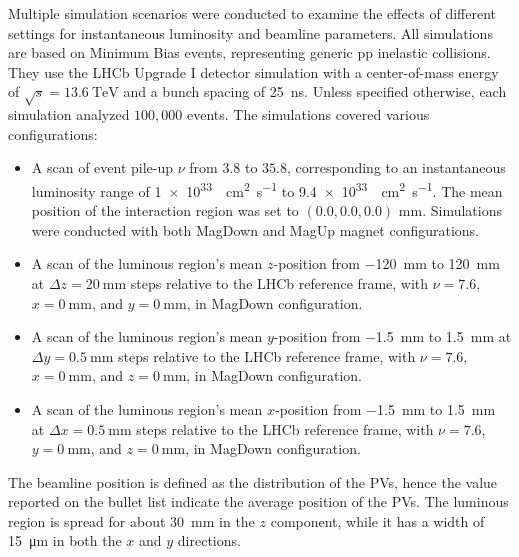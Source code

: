 Multiple simulation scenarios were conducted to examine the effects of different settings for instantaneous luminosity and beamline parameters. All simulations are based on Minimum Bias events, representing generic pp inelastic collisions. They use the LHCb Upgrade I detector simulation with a center-of-mass energy of $\sqrt{s} = \SI{13.6}{\tera\eV}$ and a bunch spacing of \SI{25}{\nano\second}. Unless specified otherwise, each simulation analyzed $100,000$ events. The simulations covered various configurations:

\begin{itemize}
    \item A scan of event pile-up \(\nu\) from $3.8$ to $35.8$, corresponding to an instantaneous luminosity range of \SI{1e33}{\per\centi\meter\squared\per\second} to \SI{9.4e33}{\per\centi\meter\squared\per\second}. The mean position of the interaction region was set to $(0.0, 0.0, 0.0)$ mm. Simulations were conducted with both MagDown and MagUp magnet configurations.

    \item A scan of the luminous region's mean $z$-position from \SI{-120}{\milli\meter} to \SI{120}{\milli\meter} at $\Delta z=\SI{20}{\milli\meter}$ steps relative to the LHCb reference frame, with $\nu = 7.6$, $x = \SI{0}{\milli\meter}$, and $y = \SI{0}{\milli\meter}$, in MagDown configuration. 

    \item A scan of the luminous region's mean $y$-position from \SI{-1.5}{\milli\meter} to \SI{1.5}{\milli\meter} at $\Delta y =\SI{0.5}{\milli\meter}$ steps relative to the LHCb reference frame, with $\nu = 7.6$, $x = \SI{0}{\milli\meter}$, and $z = \SI{0}{\milli\meter}$, in MagDown configuration.

     \item A scan of the luminous region's mean $x$-position from \SI{-1.5}{\milli\meter} to \SI{1.5}{\milli\meter} at $\Delta x =\SI{0.5}{\milli\meter}$ steps relative to the LHCb reference frame, with $\nu = 7.6$, $y = \SI{0}{\milli\meter}$, and $z = \SI{0}{\milli\meter}$, in MagDown configuration.

\end{itemize}


The beamline position is defined as the distribution of the PVs, hence the value reported on the bullet list indicate the average position of the PVs. The luminous region is spread for about \SI{30}{\milli\meter} in the $z$ component, while it has a width of \SI{15}{\micro\meter} in both the $x$ and $y$ directions.  

